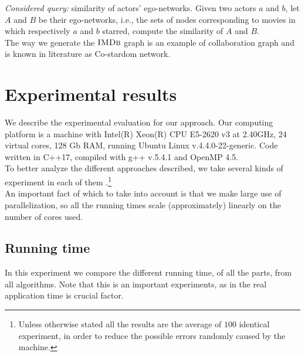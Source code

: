     
    \textsl{Considered query:} similarity of actors' ego-networks. Given two actors $a$ and $b$, let $A$ and $B$ be their ego-networks, i.e., the sets of nodes corresponding to movies in which respectively $a$ and $b$ starred, compute the similarity of $A$ and $B$.\\
    
    The way we generate the $\textsc{IMDb}$ graph is an example of collaboration graph and is known in literature as Co-stardom network.
    
    \section{Experimental results}

    We describe the experimental evaluation for our approach. Our computing platform is a machine with Intel(R) Xeon(R) CPU E5-2620 v3 at 2.40GHz, 24 virtual cores, 128 Gb RAM, running Ubuntu Linux v.4.4.0-22-generic. Code written in C++17, compiled with g++ v.5.4.1 and OpenMP 4.5.\\
    
    To better analyze the different approaches described, we take several kinds of experiment in each of them .\footnote{Unless otherwise stated all the results are the average of $100$ identical experiment, in order to reduce the possible errors randomly caused by the machine.}\\
     
    An important fact of which to take into account is that we make large use of parallelization, 
    so all the running times scale (approximately) linearly on the number of cores used.
    
	\subsection*{Running time}
	
	In this experiment we compare the different running time, of all the parts, from all algorithms. Note that this is an important experiments, as in the real application time is crucial factor.\\

